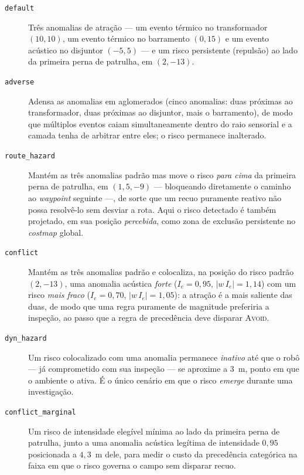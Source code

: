 \begin{description}
    \item[\texttt{default}] Três anomalias de atração --- um evento térmico no
    transformador $(10,10)$, um evento térmico no barramento $(0,15)$ e um evento
    acústico no disjuntor $(-5,5)$ --- e um risco persistente (repulsão) ao lado da
    primeira perna de patrulha, em $(2,-13)$.

    \item[\texttt{adverse}] Adensa as anomalias em aglomerados (cinco anomalias: duas
    próximas ao transformador, duas próximas ao disjuntor, mais o barramento), de modo
    que múltiplos eventos caiam simultaneamente dentro do raio sensorial e a camada
    tenha de arbitrar entre eles; o risco permanece inalterado.

    \item[\texttt{route\_hazard}] Mantém as três anomalias padrão mas move o risco
    \emph{para cima} da primeira perna de patrulha, em $(1{,}5,-9)$ --- bloqueando
    diretamente o caminho ao \textit{waypoint} seguinte ---, de sorte que um recuo
    puramente reativo não possa resolvê-lo sem desviar a rota. Aqui o risco detectado
    é também projetado, em sua posição \emph{percebida}, como zona de exclusão
    persistente no \textit{costmap} global.

    \item[\texttt{conflict}] Mantém as três anomalias padrão e colocaliza, na posição
    do risco padrão $(2,-13)$, uma anomalia acústica \emph{forte} ($I_e=0{,}95$,
    $|w\,I_e|=1{,}14$) com um risco \emph{mais fraco} ($I_e=0{,}70$,
    $|w\,I_e|=1{,}05$): a atração é a mais saliente das duas, de modo que uma regra
    puramente de magnitude preferiria a inspeção, ao passo que a regra de precedência
    deve disparar \textsc{Avoid}.

    \item[\texttt{dyn\_hazard}] Um risco colocalizado com uma anomalia permanece
    \emph{inativo} até que o robô --- já comprometido com sua inspeção --- se aproxime
    a $3$~m, ponto em que o ambiente o ativa. É o único cenário em que o risco
    \emph{emerge} durante uma investigação.

    \item[\texttt{conflict\_marginal}] Um risco de intensidade elegível mínima ao lado da
    primeira perna de patrulha, junto a uma anomalia acústica legítima de intensidade
    $0{,}95$ posicionada a $4{,}3$~m dele, para medir o custo da precedência
    categórica na faixa em que o risco governa o campo sem disparar recuo.
\end{description}


